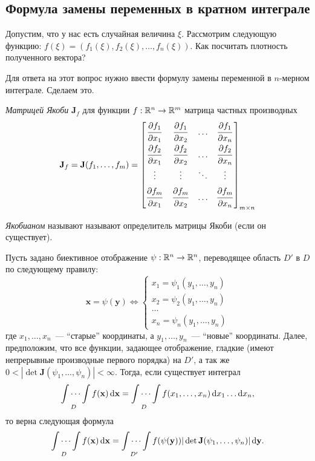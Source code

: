 \subsection{Формула замены переменных в кратном интеграле}
Допустим, что у нас есть случайная величина \(\xi\). Рассмотрим следующую 
функцию: \(f(\xi) = (f_1(\xi), f_2(\xi), \dots, f_n(\xi))\). Как посчитать 
плотность полученного вектора?

Для ответа на этот вопрос нужно ввести формулу замены переменной в \(n\)-мерном 
интеграле. Сделаем это.
\begin{definition}
	\emph{Матрицей Якоби} \(\mathbf{J}_f\) для функции \(f : \mathbb{R}^n \to \mathbb{R}^m\) 
	матрица частных производных
	\[
	\mathbf{J}_f = \mathbf{J}(f_1, \dots, f_m) =
	\begin{bmatrix}
	\dfrac{\strut\partial f_1}{\strut\partial x_1} & \dfrac{\strut\partial 
	f_1}{\strut\partial x_2} & \ldots & \dfrac{\strut\partial 
	f_1}{\strut\partial x_n} \\
	\dfrac{\strut\partial f_2}{\strut\partial x_1} & \dfrac{\strut\partial 
	f_2}{\strut\partial x_2} & \ldots & \dfrac{\strut\partial 
	f_2}{\strut\partial x_n} \\
	\vdots & \vdots & \ddots & \vdots \\[0.5em]
	\dfrac{\strut\partial f_m}{\strut\partial x_1} & \dfrac{\strut\partial 
	f_m}{\strut\partial x_2} & \ldots & \dfrac{\strut\partial 
	f_m}{\strut\partial x_n} \\
	\end{bmatrix}_{m \times n}
	\]
	
	\emph{Якобианом} называют называют определитель матрицы Якоби (если он 
	существует).
\end{definition}
\begin{theorem}
	Пусть задано биективное отображение \(\psi : \mathbb{R}^n \to \mathbb{R}^n\), переводящее 
	область \(D'\) в \(D\) по следующему правилу:
	\[ \mathbf{x} = \psi(\mathbf{y}) \iff
	\begin{cases}
	x_1 = \psi_1(y_1, \dots, y_n) \\
	x_2 = \psi_2(y_1, \dots, y_n) \\
	\dots \\
	x_n = \psi_n(y_1, \dots, y_n)
	\end{cases}
	\]
	где \(x_1, \dots, x_n\)~--- ``старые'' координаты, а \(y_1, \dots, 
	y_n\)~--- ``новые'' координаты. Далее, предположим, что все функции, 
	задающее отображение, гладкие (имеют непрерывные производные первого 
	порядка) на \(D'\), а так же \(0 < |\det \mathbf{J}(\psi_1, \dots, \psi_n)| 
	< \infty\). Тогда, если существует интеграл
	\[
	\idotsint\limits_{D} f(\mathbf{x})\mathop{}\!\mathrm{d}\mathbf{x} = \idotsint\limits_{D} 
	f(x_1, \dots, x_n)\mathop{}\!\mathrm{d} x_1 \dots \mathop{}\!\mathrm{d} x_n,
	\]
	то верна следующая формула
	\[
	\idotsint\limits_{D} f(\mathbf{x})\mathop{}\!\mathrm{d}\mathbf{x} = \idotsint\limits_{D'} 
	f(\psi(\mathbf{y}))|\det \mathbf{J}(\psi_1, \dots, \psi_n)|\mathop{}\!\mathrm{d}\mathbf{y}.
	\]
\end{theorem}
 

